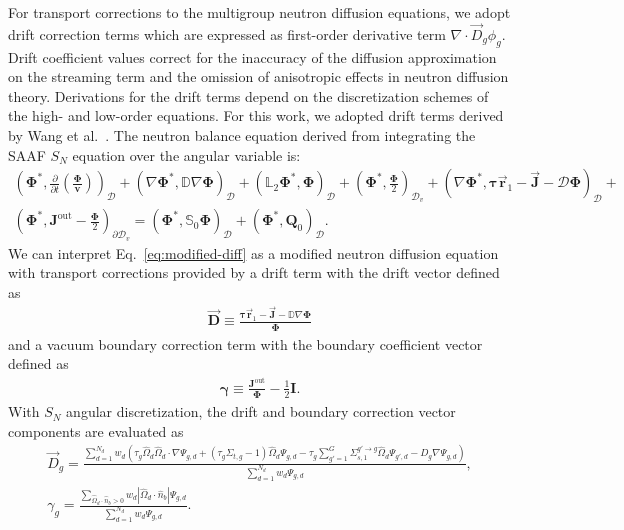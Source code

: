 \documentclass[letterpaper]{mc2025}
\begin{document}
For transport corrections to the multigroup neutron diffusion equations, we adopt drift correction
terms which are expressed as first-order derivative term $\nabla\cdot \vec{D}_g\phi_g$. Drift
coefficient values correct for the inaccuracy of the diffusion approximation on the streaming term
and the omission of anisotropic effects in neutron diffusion theory.
Derivations for the drift terms depend on the discretization schemes of the high- and low-order
equations. For this work, we adopted drift terms derived by Wang et al.\
\cite{wang_diffusion_2014}. The neutron balance equation derived from
integrating the \gls*{SAAF} $S_N$ equation over the angular variable is:
%
\begin{multline}
  \left(\bm{\Phi}^*,\frac{\partial}{\partial t}\left(\frac{\bm{\Phi}}{\bm{v}}\right)\right)_\mathcal{D}
  + \left(\nabla\bm{\Phi}^*, \mathbb{D}\nabla\bm{\Phi}\right)_\mathcal{D}
  + \left(\mathbb{L}_2\bm{\Phi}^*,\bm{\Phi}\right)_\mathcal{D}
  + \left(\bm{\Phi}^*,\frac{\bm{\Phi}}{2}\right)_{\mathcal{D}_v}
  + \left(\nabla\bm{\Phi}^*,\bm{\tau}\vec{\bm{r}}_1-\vec{\bm{J}}-\mathcal{D}\bm{\Phi}\right)_\mathcal{D}
  + \\
  \left(\bm{\Phi}^*,\bm{J}^\text{out}-\frac{\bm{\Phi}}{2}\right)_{\partial\mathcal{D}_v}
  = \left(\bm{\Phi}^*,\mathbb{S}_0\bm{\Phi}\right)_\mathcal{D}
  + \left(\bm{\Phi}^*,\bm{Q}_0\right)_\mathcal{D}. \label{eq:modified-diff}
\end{multline}
%
We can interpret Eq.\ \ref{eq:modified-diff} as a modified neutron diffusion equation with
transport corrections provided by a drift term with the drift vector defined as
%
\begin{gather}
  \vec{\bm{D}} \equiv \frac{\bm{\tau}\vec{\bm{r}}_1-\vec{\bm{J}}-\mathbb{D}\nabla\bm{\Phi}}{\bm{\Phi}}
\end{gather}
%
and a vacuum boundary correction term with the boundary coefficient vector defined as
%
\begin{gather}
  \bm{\gamma} \equiv \frac{\bm{J}^\text{out}}{\bm{\Phi}}-\frac{1}{2}\bm{I}.
\end{gather}
%
With $S_N$ angular discretization, the drift and boundary correction vector components are
evaluated as
%
\begin{gather}
  \vec{D}_g = \frac{\sum^{N_d}_{d=1}w_d\left(\tau_g\hat{\Omega}_d\hat{\Omega}_d\cdot\nabla\Psi_{g,d}
  + \left(\tau_g\Sigma_{t,g}-1\right)\hat{\Omega}_d\Psi_{g,d}
  - \tau_g\sum^G_{g'=1}\Sigma^{g'\rightarrow g}_{s,1}\hat{\Omega}_d\Psi_{g',d}
  - D_g\nabla\Psi_{g,d}\right)}{\sum^{N_d}_{d=1}w_d\Psi_{g,d}}, \label{eq:drift} \\
  \gamma_g =
  \frac{\sum_{\hat{\Omega}_d\cdot\hat{n}_b > 0}w_d |\hat{\Omega}_d\cdot\hat{n}_b |
  \Psi_{g,d}}{\sum^{N_d}_{d=1}w_d\Psi_{g,d}}. \label{eq:bound-coef}
\end{gather}
\end{document}
